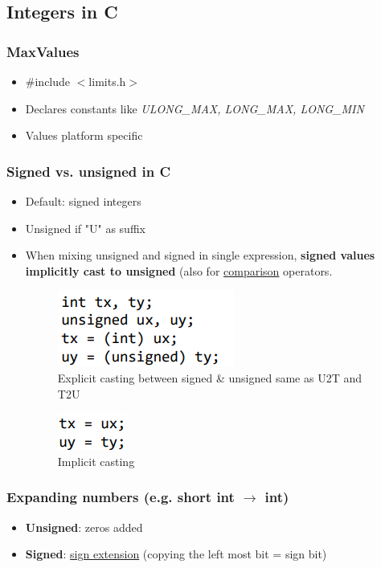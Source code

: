 \documentclass[a4paper,10pt]{article}
\begin{document}
\subsection{Integers in C}
\subsubsection{MaxValues}
\begin{itemize}
    \item \#include $<$limits.h$>$ 
    \item Declares constants like \textit{ULONG\_MAX, LONG\_MAX, LONG\_MIN}
    \item Values platform specific
\end{itemize}
\subsubsection{Signed vs. unsigned in C}
\begin{itemize}
    \item Default: signed integers
    \item Unsigned if "U" as suffix
    \item When mixing unsigned and signed in single expression, \textbf{signed values implicitly cast to unsigned} (also for \underline{comparison} operators.
    
    \begin{figure}[h!]
        \centering
        \includegraphics[width=0.5\linewidth]{Pictures/e17.png}
        \caption{Explicit casting between signed \& unsigned same as U2T and T2U}
        \label{fig:enter-label}
    \end{figure}
    \begin{figure}[h!]
        \centering
        \includegraphics[width=0.2\linewidth]{Pictures/e18.png}
        \caption{Implicit casting}
        \label{fig:enter-label}
    \end{figure}    
\end{itemize}
\subsubsection{Expanding numbers (e.g. short int $\rightarrow$ int)}
\begin{itemize}
    \item \textbf{Unsigned}: zeros added
    \item \textbf{Signed}: \underline{sign extension} (copying the left most bit = sign bit)
\end{itemize}
\end{document}
